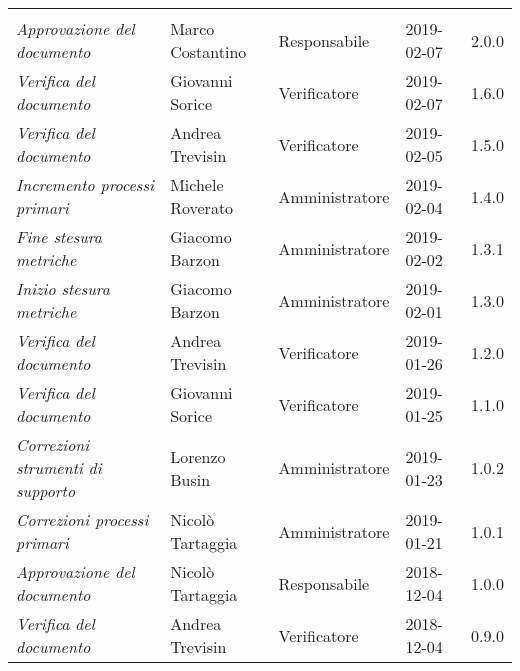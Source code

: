 \newpage 
\section*{}
	\begin{longtable}{p{4cm}|C{3cm}|C{3cm}|R{2.5cm}|R{2cm}}

		 & & & & \\
		\endhead
		
		\emph{Approvazione del documento} & Marco Costantino & Responsabile & 2019-02-07 & 2.0.0 \\
		\hline
		
		\emph{Verifica del documento} & Giovanni Sorice & Verificatore & 2019-02-07 & 1.6.0 \\
		\hline
		
		\emph{Verifica del documento} & Andrea Trevisin & Verificatore & 2019-02-05 & 1.5.0 \\
		\hline
		
		\emph{Incremento processi primari} & Michele Roverato & Amministratore & 2019-02-04 & 1.4.0 \\
		\hline
		
		\emph{Fine stesura metriche} & Giacomo Barzon & Amministratore & 2019-02-02 & 1.3.1 \\
		\hline
		
		\emph{Inizio stesura metriche} & Giacomo Barzon & Amministratore & 2019-02-01 & 1.3.0 \\
		\hline
		
		\emph{Verifica del documento} & Andrea Trevisin & Verificatore & 2019-01-26 & 1.2.0 \\
		\hline
		
		\emph{Verifica del documento} & Giovanni Sorice & Verificatore & 2019-01-25 & 1.1.0 \\
		\hline
		
		\emph{Correzioni strumenti di supporto} & Lorenzo Busin & Amministratore & 2019-01-23 & 1.0.2 \\
		\hline
		
		\emph{Correzioni processi primari} & Nicolò Tartaggia & Amministratore & 2019-01-21 & 1.0.1 \\
		\hline
		
		\emph{Approvazione del documento} & Nicolò Tartaggia & Responsabile & 2018-12-04 & 1.0.0 \\
		\hline
		
		\emph{Verifica del documento} & Andrea Trevisin & Verificatore & 2018-12-04 & 0.9.0 \\
		\hline
		

\end{longtable}
